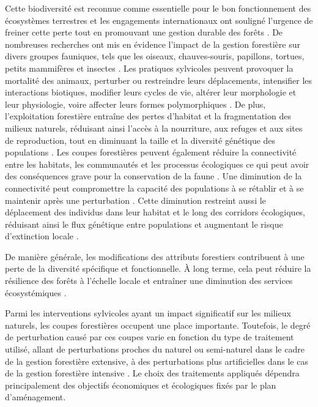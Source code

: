 Cette biodiversité est reconnue comme essentielle pour le bon fonctionnement des écosystèmes terrestres et les engagements internationaux ont souligné l'urgence de freiner cette perte tout en promouvant une gestion durable des forêts \citep{Scherer-Lorenzen2005ForestDiversity,Parviainen2007Maintenanceconservation,Newbold2015Globaleffects}. 
De nombreuses recherches ont mis en évidence l'impact de la gestion forestière sur divers groupes fauniques, tels que les oiseaux, chauves-souris, papillons, tortues, petits mammifères et insectes \citep{Summerville2011Managingforest, Currylow2012ShortTermForest, Kaminski2013EffectsForest, Kellner2013Shorttermresponses, Caldwell2019ComparisonBat}. 
Les pratiques sylvicoles peuvent provoquer la mortalité des animaux, perturber ou restreindre leurs déplacements, intensifier les interactions biotiques, modifier leurs cycles de vie, altérer leur morphologie et leur physiologie, voire affecter leurs formes polymorphiques \citep{Sergio2018Animalresponses}. 
De plus, l'exploitation forestière entraîne des pertes d'habitat et la fragmentation des milieux naturels, réduisant ainsi l'accès à la nourriture, aux refuges et aux sites de reproduction, tout en diminuant la taille et la diversité génétique des populations \citep{Coelho2020Effectsanthropogenic}.
Les coupes forestières peuvent également réduire la connectivité entre les habitats, les communautés et les processus écologiques ce qui peut avoir des conséquences grave pour la conservation de la faune \citep{Lindenmayer2006Generalmanagement}. 
Une diminution de la connectivité peut compromettre la capacité des populations à se rétablir et à se maintenir après une perturbation \citep{Lamberson1994ReserveDesign}. 
Cette diminution restreint aussi le déplacement des individus dans leur habitat et le long des corridors écologiques, réduisant ainsi le flux génétique entre populations et augmentant le risque d'extinction locale \citep{Saccheri1998Inbreedingextinction}.

De manière générale, les modifications des attributs forestiers contribuent à une perte de la diversité spécifique et fonctionnelle. 
À long terme, cela peut réduire la résilience des forêts à l'échelle locale et entraîner une diminution des services écosystémiques \citep{Hooper2012globalsynthesis,Edwards2014Maintainingecosystem}. 

%

Parmi les interventions sylvicoles ayant un impact significatif sur les milieux naturels, les coupes forestières occupent une place importante. 
Toutefois, le degré de perturbation causé par ces coupes varie en fonction du type de traitement utilisé, allant de perturbations proches du naturel ou semi-naturel dans le cadre de la gestion forestière extensive, à des perturbations plus artificielles dans le cas de la gestion forestière intensive \citep{Ameray2021Forestcarbon}. 
Le choix des traitements appliqués dépendra principalement des objectifs économiques et écologiques fixés par le plan d'aménagement.


